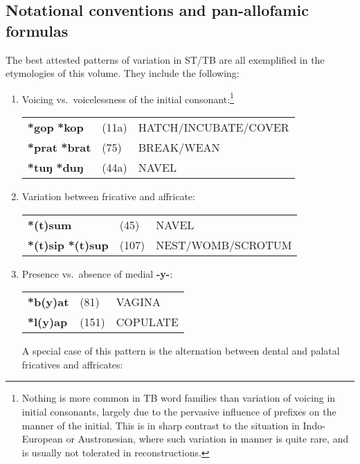 \subsection{Notational conventions and pan-allofamic formulas}

The best attested patterns of variation in ST/TB are all exemplified in the
etymologies of this volume. They include the following:

\begin{enumerate}
\item %
Voicing vs.\ voicelessness of the initial consonant:\footnote{Nothing is
more common in TB word families than variation of voicing in initial consonants,
largely due to the pervasive influence of prefixes on the manner of the initial.
 This is in sharp contrast to the situation in Indo-European or Austronesian, where such
variation in manner is quite rare, and is usually not tolerated in
reconstructions.}\nopagebreak[4]

\begin{tabular}{lll}
\textbf{*gop} \STEDTU{⪤} \textbf{*kop}	&(11a)	&HATCH/INCUBATE/COVER\\
\textbf{*prat} \STEDTU{⪤} \textbf{*brat}	&(75)	&BREAK/WEAN\\
\textbf{*tuŋ} \STEDTU{⪤} \textbf{*duŋ}	&(44a)	&NAVEL\\
\end{tabular}

\item %
Variation between fricative and affricate:

\begin{tabular}{lll}
\textbf{*(t)sum}	&(45)		&NAVEL\\
\textbf{*(t)sip} \STEDTU{⪤} \textbf{*(t)sup} &(107)	&NEST/WOMB/SCROTUM\footnotemark\\
\end{tabular}

\item %
Presence vs.\ absence of medial \textbf{-y-}:

\begin{tabular}{lll}
\textbf{*b(y)at}	&(81)		&VAGINA\\
\textbf{*l(y)ap}	&(151)		&COPULATE\\
\end{tabular}

A special case of this pattern is the alternation between dental and palatal fricatives
and affricates:


\end{enumerate}

